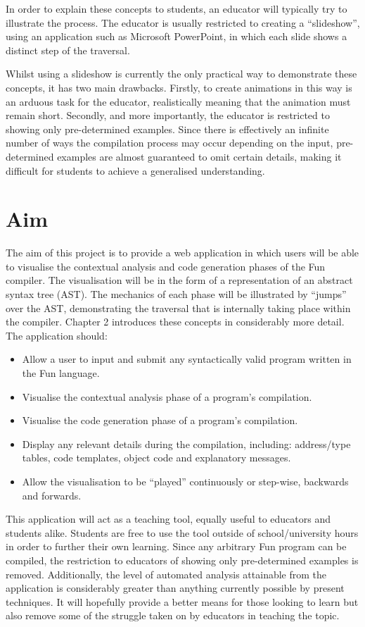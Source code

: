 \documentclass{l4proj}
\begin{document}
In order to explain these concepts to students, an educator will typically try to illustrate the process. The educator is usually restricted to creating a ``slideshow'', using an application such as Microsoft PowerPoint, in which each slide shows a distinct step of the traversal. 

Whilst using a slideshow is currently the only practical way to demonstrate these concepts, it has two main drawbacks. Firstly, to create animations in this way is an arduous task for the educator, realistically meaning that the animation must remain short. Secondly, and more importantly, the educator is restricted to showing only pre-determined examples. Since there is effectively an infinite number of ways the compilation process may occur depending on the input, pre-determined examples are almost guaranteed to omit certain details, making it difficult for students to achieve a generalised understanding.

\section{Aim}
The aim of this project is to provide a web application in which users will be able to visualise the contextual analysis and code generation phases of the Fun compiler. The visualisation will be in the form of a representation of an abstract syntax tree (AST). The mechanics of each phase will be illustrated by ``jumps'' over the AST, demonstrating the traversal that is internally taking place within the compiler. Chapter 2 introduces these concepts in considerably more detail. The application should:
\begin{itemize}
\item Allow a user to input and submit any syntactically valid program written in the Fun language.
\item Visualise the contextual analysis phase of a program's compilation. 
\item Visualise the code generation phase of a program's compilation.
\item Display any relevant details during the compilation, including: address/type tables, code templates, object code and explanatory messages.
\item Allow the visualisation to be ``played'' continuously or step-wise, backwards and forwards.
\end{itemize}

This application will act as a teaching tool, equally useful to educators and students alike. Students are free to use the tool outside of school/university hours in order to further their own learning. Since any arbitrary Fun program can be compiled, the restriction to educators of showing only pre-determined examples is removed. Additionally, the level of automated analysis attainable from the application is considerably greater than anything currently possible by present techniques. It will hopefully provide a better means for those looking to learn but also remove some of the struggle taken on by educators in teaching the topic.
\end{document}
